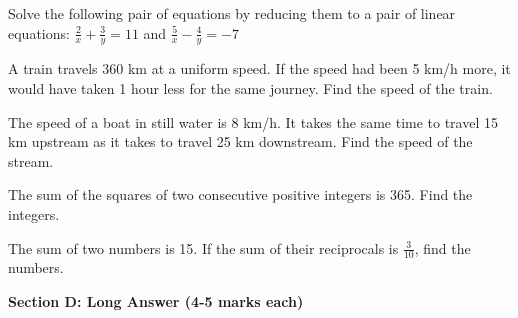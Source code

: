 \documentclass[12pt,a4paper]{exam}
\begin{document}
\begin{questions}
\question[3] Solve the following pair of equations by reducing them to a pair of linear equations:
$\frac{2}{x} + \frac{3}{y} = 11$ and $\frac{5}{x} - \frac{4}{y} = -7$
\vspace{0.15cm}

\question[3] A train travels 360 km at a uniform speed. If the speed had been 5 km/h more, it would have taken 1 hour less for the same journey. Find the speed of the train.
\vspace{0.15cm}

\question[3] The speed of a boat in still water is 8 km/h. It takes the same time to travel 15 km upstream as it takes to travel 25 km downstream. Find the speed of the stream.
\vspace{0.15cm}

\question[3] The sum of the squares of two consecutive positive integers is 365. Find the integers.
\vspace{0.15cm}

\question[3] The sum of two numbers is 15. If the sum of their reciprocals is $\frac{3}{10}$, find the numbers.
\vspace{0.15cm}

\end{questions}
\bigskip
\noindent\textbf{\large Section D: Long Answer (4-5 marks each)}
\end{document}
